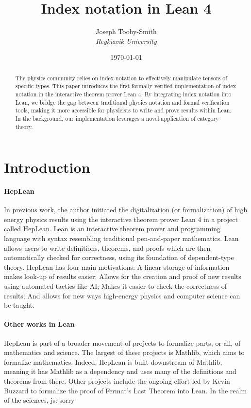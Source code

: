 \documentclass[a4paper, 11pt]{article}
\title{Index notation in Lean 4}
\author{Joseph Tooby-Smith \\ \textit{Reykjavik University}}
\date{\today}
\newcommand{\js}[1]{ {\color{magenta} js:  #1}}
\begin{document}
\maketitle
\vspace{-1cm}
\begin{abstract}
The physics community relies on index notation to effectively manipulate tensors of specific 
types. This paper introduces the first formally verified implementation of index notation in the
interactive theorem prover Lean 4. By integrating index notation into Lean, we bridge the gap between 
traditional physics notation and formal verification tools, 
making it more accessible for physicists to write and prove results within Lean.
In the background, our implementation leverages a novel application of category theory.
\end{abstract}

\section{Introduction}

\paragraph{HepLean} In previous work, the author initiated the digitalization (or formalization) 
of high energy physics 
results using the interactive theorem prover Lean 4 in a project called HepLean. 
Lean is an interactive theorem prover and 
programming language with syntax resembling traditional pen-and-paper mathematics. 
Lean allows users to write definitions, theorems, and proofs 
which are then automatically checked for correctness, using its foundation of dependent-type theory.
HepLean has four main motivations: A linear storage of information makes look-up of results 
easier; Allows for the creation and proof of new results using automated tactics like AI; 
Makes it easier to check the correctness of results; And allows for new ways 
high-energy physics and computer science can be taught. 

\paragraph{Other works in Lean} HepLean is part of a broader movement of projects
to formalize parts, or all, of 
mathematics and science. The largest of these projects is Mathlib, which aims to formalize
mathematics. Indeed, HepLean is built downstream of Mathlib, meaning it has Mathlib as a 
dependency and uses many of the definitions and theorems from there. 
Other projects include the ongoing effort led by Kevin Buzzard to formalize the proof of Fermat's
Last Theorem into Lean. 
In the realm of the sciences, \js{sorry}
\end{document}
